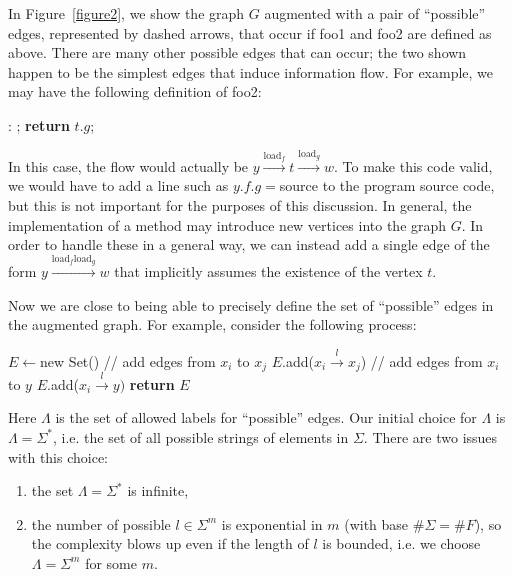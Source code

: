 \documentclass[10pt,twocolumn]{article}
\theoremstyle{definition}
\begin{document}
\noindent In Figure~\ref{figure2}, we show the graph $G$ augmented with a pair of ``possible'' edges, represented by dashed arrows, that occur if foo1 and foo2 are defined as above. There are many other possible edges that can occur; the two shown happen to be the simplest edges that induce information flow. For example, we may have the following definition of foo2:
\begin{algorithmic}
:
  ;
  \State\textbf{return} $t.g$;
\EndProcedure
\end{algorithmic}
\noindent In this case, the flow would actually be $y\xrightarrow{\text{load}_f}t\xrightarrow{\text{load}_g}w$. To make this code valid, we would have to add a line such as $y.f.g=$source to the program source code, but this is not important for the purposes of this discussion. In general, the implementation of a method may introduce new vertices into the graph $G$. In order to handle these in a general way, we can instead add a single edge of the form $y\xrightarrow{\text{load}_f\text{load}_g}w$ that implicitly assumes the existence of the vertex $t$.

Now we are close to being able to precisely define the set of ``possible'' edges in the augmented graph. For example, consider the following process:
\begin{algorithmic}
  \State $E\gets$new Set()
	  	\State // add edges from $x_i$ to $x_j$
	  		\State $E$.add($x_i\xrightarrow{l}x_j$)
	  	\EndFor	  	
	  	\State // add edges from $x_i$ to $y$
	  		\State $E$.add($x_i\xrightarrow{l}y)$
	  	\EndFor
	  \EndIf
	\EndFor
	\State\textbf{return} $E$
\EndProcedure
\end{algorithmic}
\noindent Here $\Lambda$ is the set of allowed labels for ``possible'' edges. Our initial choice for $\Lambda$ is $\Lambda=\Sigma^*$, i.e. the set of all possible strings of elements in $\Sigma$. There are two issues with this choice:
\begin{enumerate}
\item the set $\Lambda=\Sigma^*$ is infinite,
\item the number of possible $l\in\Sigma^m$ is exponential in $m$ (with base $\#\Sigma=\#F$), so the complexity blows up even if the length of $l$ is bounded, i.e. we choose $\Lambda=\Sigma^m$ for some $m$.
\end{enumerate}
\end{document}
